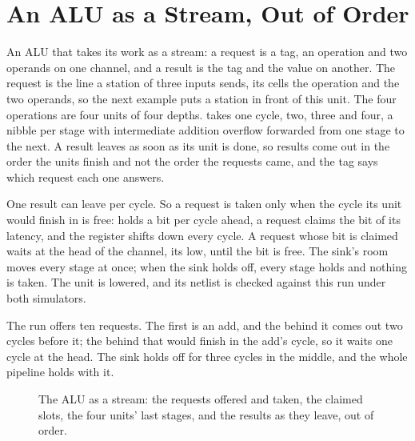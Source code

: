 \section{An ALU as a Stream, Out of Order}
\label{sec:x-stream-alu}

An ALU that takes its work as a stream: a request is a tag, an
operation and two operands on one channel, and a result is the tag
and the value on another. The request is the line a station of
three inputs sends, its cells the operation and the two operands,
so the next example puts a station in front of this unit. The four operations are four units of four
depths.  takes one cycle,  two,  three
and  four, a nibble per stage with intermediate addition
overflow forwarded from one stage to the next. A result leaves as soon
as its unit is done,
so results come out in the order the units finish and not the order
the requests came, and the tag says which request each one answers.

One result can leave per cycle. So a request is taken only when the
cycle its unit would finish in is free:  holds a bit per
cycle ahead, a request claims the bit of its latency, and the
register shifts down every cycle. A request whose bit is claimed
waits at the head of the channel, its  low, until the
bit is free. The sink's room moves every stage at once; when the
sink holds off, every stage holds and nothing is taken. The unit is
lowered, and its netlist is checked against this run under both
simulators.

The run offers ten requests. The first is an add, and the 
behind it comes out two cycles before it; the  behind that
would finish in the add's cycle, so it waits one cycle at the head.
The sink holds off for three cycles in the middle, and the whole
pipeline holds with it.

\begin{figure}[htbp]
\centering

\caption{The ALU as a stream: the requests offered and taken, the
claimed slots, the four units' last stages, and the results as they
leave, out of order.}
\label{fig:x-stream-alu}
\end{figure}






